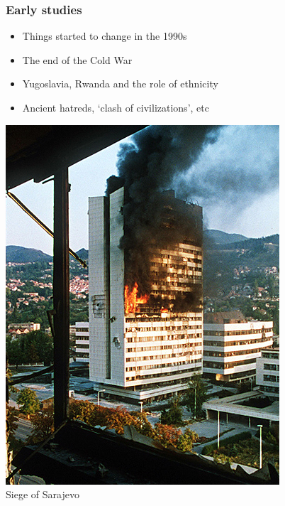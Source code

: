 \documentclass[utf8, xcolor=dvipsnames]{beamer}
\begin{document}
\begin{frame}
\frametitle{Early studies}
\centering

\begin{minipage}{0.59\textwidth}\centering
  \begin{itemize}
    \item Things started to change in the 1990s
    \item The end of the Cold War
    \item Yugoslavia, Rwanda and the role of ethnicity
    \item Ancient hatreds, `clash of civilizations', etc
  \end{itemize}
\end{minipage}\hfill
\begin{minipage}{0.39\textwidth}\centering
\includegraphics[width = \textwidth]{img/sarajevo}\\Siege of Sarajevo
\end{minipage}

\end{frame}
\end{document}
